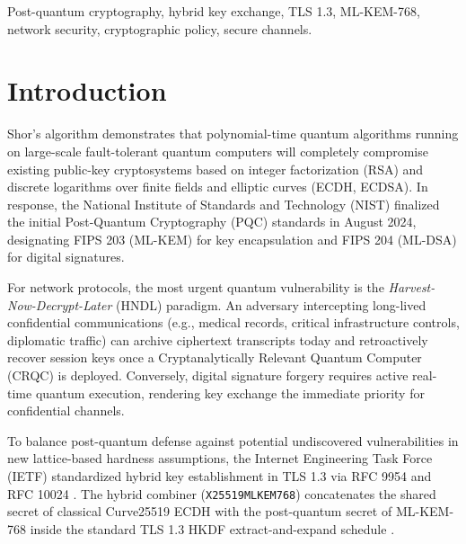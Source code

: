 \documentclass[conference]{IEEEtran}
\begin{document}
\begin{IEEEkeywords}
Post-quantum cryptography, hybrid key exchange, TLS 1.3, ML-KEM-768, network security, cryptographic policy, secure channels.
\end{IEEEkeywords}

\section{Introduction}
Shor's algorithm \cite{shor1997polynomial} demonstrates that polynomial-time quantum algorithms running on large-scale fault-tolerant quantum computers will completely compromise existing public-key cryptosystems based on integer factorization (RSA) and discrete logarithms over finite fields and elliptic curves (ECDH, ECDSA). In response, the National Institute of Standards and Technology (NIST) finalized the initial Post-Quantum Cryptography (PQC) standards in August 2024, designating FIPS 203 (ML-KEM) \cite{nist_fips203} for key encapsulation and FIPS 204 (ML-DSA) \cite{nist_fips204} for digital signatures.

For network protocols, the most urgent quantum vulnerability is the \textit{Harvest-Now-Decrypt-Later} (HNDL) paradigm. An adversary intercepting long-lived confidential communications (e.g., medical records, critical infrastructure controls, diplomatic traffic) can archive ciphertext transcripts today and retroactively recover session keys once a Cryptanalytically Relevant Quantum Computer (CRQC) is deployed. Conversely, digital signature forgery requires active real-time quantum execution, rendering key exchange the immediate priority for confidential channels.

To balance post-quantum defense against potential undiscovered vulnerabilities in new lattice-based hardness assumptions, the Internet Engineering Task Force (IETF) standardized hybrid key establishment in TLS 1.3 via RFC 9954 \cite{rfc9954} and RFC 10024 \cite{rfc10024}. The hybrid combiner (\texttt{X25519MLKEM768}) concatenates the shared secret of classical Curve25519 ECDH with the post-quantum secret of ML-KEM-768 inside the standard TLS 1.3 HKDF extract-and-expand schedule \cite{rfc8446}.
\end{document}
